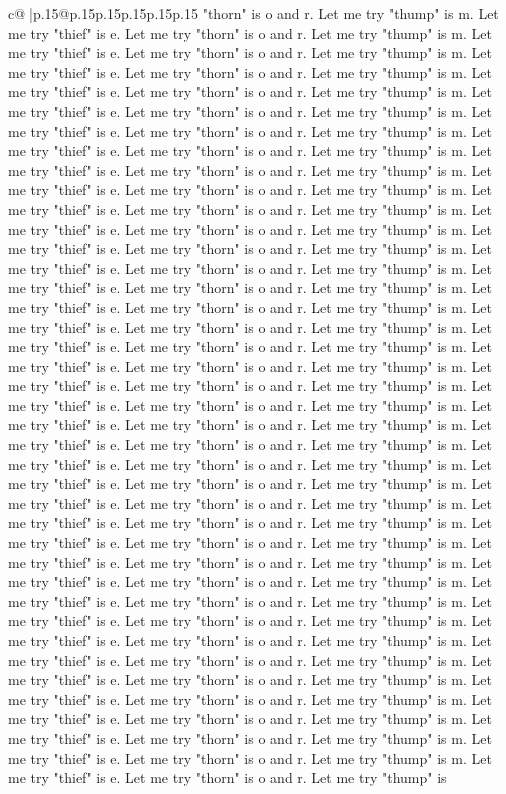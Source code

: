 \documentclass{article}
\begin{document}
{\begin{supertabular}{c@{$\;$}|p{.15\linewidth}@{}p{.15\linewidth}p{.15\linewidth}p{.15\linewidth}p{.15\linewidth}p{.15\linewidth}}
{{{"thorn" is o and r. Let me try "thump" is m. Let me try "thief" is e. Let me try "thorn" is o and r. Let me try "thump" is m. Let me try "thief" is e. Let me try "thorn" is o and r. Let me try "thump" is m. Let me try "thief" is e. Let me try "thorn" is o and r. Let me try "thump" is m. Let me try "thief" is e. Let me try "thorn" is o and r. Let me try "thump" is m. Let me try "thief" is e. Let me try "thorn" is o and r. Let me try "thump" is m. Let me try "thief" is e. Let me try "thorn" is o and r. Let me try "thump" is m. Let me try "thief" is e. Let me try "thorn" is o and r. Let me try "thump" is m. Let me try "thief" is e. Let me try "thorn" is o and r. Let me try "thump" is m. Let me try "thief" is e. Let me try "thorn" is o and r. Let me try "thump" is m. Let me try "thief" is e. Let me try "thorn" is o and r. Let me try "thump" is m. Let me try "thief" is e. Let me try "thorn" is o and r. Let me try "thump" is m. Let me try "thief" is e. Let me try "thorn" is o and r. Let me try "thump" is m. Let me try "thief" is e. Let me try "thorn" is o and r. Let me try "thump" is m. Let me try "thief" is e. Let me try "thorn" is o and r. Let me try "thump" is m. Let me try "thief" is e. Let me try "thorn" is o and r. Let me try "thump" is m. Let me try "thief" is e. Let me try "thorn" is o and r. Let me try "thump" is m. Let me try "thief" is e. Let me try "thorn" is o and r. Let me try "thump" is m. Let me try "thief" is e. Let me try "thorn" is o and r. Let me try "thump" is m. Let me try "thief" is e. Let me try "thorn" is o and r. Let me try "thump" is m. Let me try "thief" is e. Let me try "thorn" is o and r. Let me try "thump" is m. Let me try "thief" is e. Let me try "thorn" is o and r. Let me try "thump" is m. Let me try "thief" is e. Let me try "thorn" is o and r. Let me try "thump" is m. Let me try "thief" is e. Let me try "thorn" is o and r. Let me try "thump" is m. Let me try "thief" is e. Let me try "thorn" is o and r. Let me try "thump" is m. Let me try "thief" is e. Let me try "thorn" is o and r. Let me try "thump" is m. Let me try "thief" is e. Let me try "thorn" is o and r. Let me try "thump" is m. Let me try "thief" is e. Let me try "thorn" is o and r. Let me try "thump" is m. Let me try "thief" is e. Let me try "thorn" is o and r. Let me try "thump" is m. Let me try "thief" is e. Let me try "thorn" is o and r. Let me try "thump" is m. Let me try "thief" is e. Let me try "thorn" is o and r. Let me try "thump" is m. Let me try "thief" is e. Let me try "thorn" is o and r. Let me try "thump" is m. Let me try "thief" is e. Let me try "thorn" is o and r. Let me try "thump" is m. Let me try "thief" is e. Let me try "thorn" is o and r. Let me try "thump" is m. Let me try "thief" is e. Let me try "thorn" is o and r. Let me try "thump" is m. Let me try "thief" is e. Let me try "thorn" is o and r. Let me try "thump" is m. Let me try "thief" is e. Let me try "thorn" is o and r. Let me try "thump" is m. Let me try "thief" is e. Let me try "thorn" is o and r. Let me try "thump" is m. Let me try "thief" is e. Let me try "thorn" is o and r. Let me try "thump" is m. Let me try "thief" is e. Let me try "thorn" is o and r. Let me try "thump" is }}}
\end{supertabular}}
\end{document}
